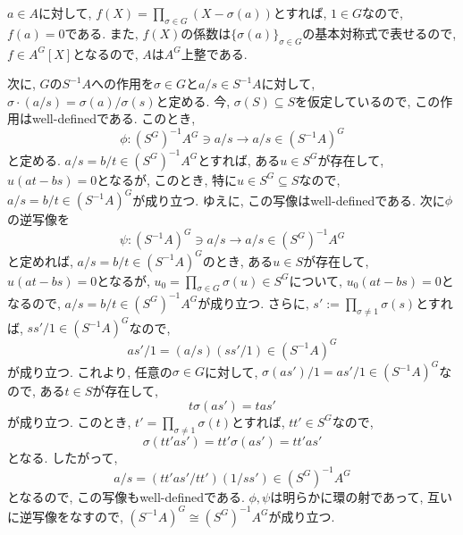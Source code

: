 \documentclass[dvipdfmx]{jsarticle}
\begin{document}
    \begin{problem}
        $a \in A$に対して, $f(X) = \prod_{\sigma \in G}(X-\sigma(a))$とすれば, $1 \in G$なので,
        $f(a) = 0$である.
        また, $f(X)$の係数は$\{\sigma(a)\}_{\sigma \in G}$の基本対称式で表せるので,
        $f \in A^G[X]$となるので, $A$は$A^G$上整である.

        次に, $G$の$S^{-1}A$への作用を$\sigma \in G$と$a/s \in S^{-1}A$に対して,
        $\sigma \cdot (a/s) = \sigma(a)/\sigma(s)$と定める.
        今, $\sigma(S) \subseteq S$を仮定しているので,
        この作用はwell-definedである.
        このとき,
        \[
            \phi: (S^{G})^{-1}A^{G} \ni a/s \longrightarrow a/s \in (S^{-1}A)^G
        \]
        と定める.
        $a/s = b/t \in (S^G)^{-1}A^G$とすれば,
        ある$u \in S^G$が存在して, $u(at-bs) = 0$となるが,
        このとき, 特に$u \in S^G \subseteq S$なので, $a/s = b/t \in (S^{-1}A)^G$が成り立つ.
        ゆえに, この写像はwell-definedである.
        次に$\phi$の逆写像を
        \[
            \psi: (S^{-1}A)^G \ni a/s \longrightarrow a/s \in (S^G)^{-1}A^G
        \]
        と定めれば, $a/s = b/t \in (S^{-1}A)^G$のとき,
        ある$u \in S$が存在して, $u(at-bs) = 0$となるが,
        $u_0 = \prod_{\sigma \in G} \sigma(u) \in S^{G}$について,
        $u_0(at-bs) = 0$となるので, $a/s = b/t \in (S^{G})^{-1}A^G$が成り立つ.
        さらに,
        $s' := \prod_{\sigma \neq 1} \sigma(s)$とすれば, $ss'/1 \in (S^{-1}A)^G$なので,
        \[
            as'/1 = (a/s)(ss'/1) \in (S^{-1}A)^G
        \]
        が成り立つ.
        これより, 任意の$\sigma \in G$に対して, $\sigma(as')/1 = as'/1 \in (S^{-1}A)^G$なので,
        ある$t \in S$が存在して,
        \[
            t\sigma(as') = tas'
        \]
        が成り立つ.
        このとき, $t' = \prod_{\sigma \neq 1} \sigma(t)$とすれば, $tt' \in S^G$なので,
        \[
            \sigma(tt'as') = tt' \sigma(as') = tt'as'
        \]
        となる.
        したがって,
        \[
            a/s = (tt'as'/tt')(1/ss') \in (S^G)^{-1}A^G
        \]
        となるので, この写像もwell-definedである.
        $\phi, \psi$は明らかに環の射であって, 互いに逆写像をなすので,
        $(S^{-1}A)^G \cong (S^G)^{-1}A^G$が成り立つ.
    \end{problem}
\end{document}
